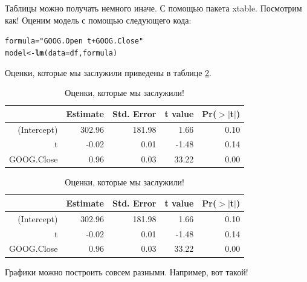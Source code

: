 \documentclass[12pt, a4paper]{article}\usepackage[]{graphicx}\usepackage[]{color}
\makeatletter
\newcommand{\hlstr}[1]{\textcolor[rgb]{0.192,0.494,0.8}{#1}}%
\newcommand{\hlstd}[1]{\textcolor[rgb]{0.345,0.345,0.345}{#1}}%
\newcommand{\hlkwb}[1]{\textcolor[rgb]{0.69,0.353,0.396}{#1}}%
\newcommand{\hlkwc}[1]{\textcolor[rgb]{0.333,0.667,0.333}{#1}}%
\newcommand{\hlkwd}[1]{\textcolor[rgb]{0.737,0.353,0.396}{\textbf{#1}}}%
\newenvironment{kframe}{%
 \def\at@end@of@kframe{}%
 \ifinner\ifhmode%
  \def\at@end@of@kframe{\end{minipage}}%
  \begin{minipage}{\columnwidth}%
 \fi\fi%
 \def\FrameCommand##1{\hskip\@totalleftmargin \hskip-\fboxsep
 \colorbox{shadecolor}{##1}\hskip-\fboxsep
     \hskip-\linewidth \hskip-\@totalleftmargin \hskip\columnwidth}%
 \MakeFramed {\advance\hsize-\width
   \@totalleftmargin\z@ \linewidth\hsize
   \@setminipage}}%
 {\par\unskip\endMakeFramed%
 \at@end@of@kframe}
\newenvironment{knitrout}{}{} %
\makeatother
\begin{document}
Таблицы можно получать немного иначе. С помощью пакета xtable. Посмотрим как! Оценим модель с помощью следующего кода: 

\begin{knitrout}
\color{fgcolor}\begin{kframe}
\begin{alltt}
\hlstd{formula} \hlkwb{=} \hlstr{"GOOG.Open~t+GOOG.Close"}
\hlstd{model} \hlkwb{<-} \hlkwd{lm}\hlstd{(}\hlkwc{data}\hlstd{=df,formula)}
\end{alltt}
\end{kframe}
\end{knitrout}


Оценки, которые мы заслужили приведены в таблице \ref{tab:regress}. 

\begin{table}[ht]
\centering
\begin{tabular}{rrrrr}
  \hline
 & Estimate & Std. Error & t value & Pr($>$$|$t$|$) \\ 
  \hline
(Intercept) & 302.96 & 181.98 & 1.66 & 0.10 \\ 
  t & -0.02 & 0.01 & -1.48 & 0.14 \\ 
  GOOG.Close & 0.96 & 0.03 & 33.22 & 0.00 \\ 
   \hline
\end{tabular}
\caption{Оценки, которые мы заслужили!} 
\label{tab:regress}
\end{table}



\begin{table}[ht]
\centering
\begin{tabular}{rrrrr}
  \hline
 & Estimate & Std. Error & t value & Pr($>$$|$t$|$) \\ 
  \hline
(Intercept) & 302.96 & 181.98 & 1.66 & 0.10 \\ 
  t & -0.02 & 0.01 & -1.48 & 0.14 \\ 
  GOOG.Close & 0.96 & 0.03 & 33.22 & 0.00 \\ 
   \hline
\end{tabular}
\caption{Оценки, которые мы заслужили!} 
\label{tab:regress}
\end{table}


Графики можно построить совсем разными. Например, вот такой! 
\end{document}
